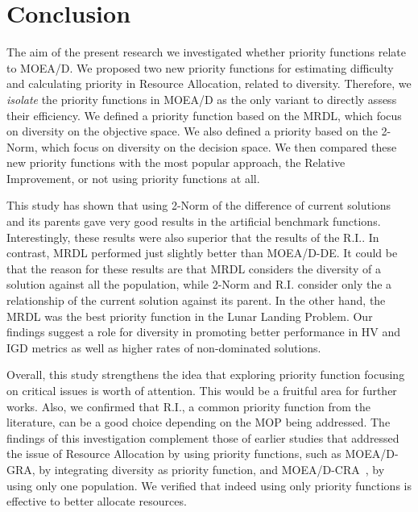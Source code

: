 \section{Conclusion}
The aim of the present research we investigated whether priority functions relate to MOEA/D.
We proposed two new priority functions for estimating difficulty and calculating priority in Resource Allocation, related to diversity. Therefore, we \emph{isolate} the priority functions in MOEA/D as the only variant to directly assess their efficiency. We defined a priority function based on the MRDL, which focus on diversity on the objective space. We also defined a priority based on the 2-Norm, which focus on diversity on the decision space. We then compared these new priority functions with the most popular approach, the Relative Improvement, or not using priority functions at all.

This study has shown that using 2-Norm of the difference of current solutions and its parents gave very good results in the artificial benchmark functions. Interestingly, these results were also superior that the results of the R.I.. In contrast, MRDL performed just slightly better than MOEA/D-DE. It could be that the reason for these results are that MRDL considers the diversity of a solution against all the population, while 2-Norm and R.I. consider only the a relationship of the current solution against its parent. In the other hand, the MRDL was the best priority function in the Lunar Landing Problem. Our findings suggest a role for diversity in promoting better performance in HV and IGD metrics as well as higher rates of non-dominated solutions.

Overall, this study strengthens the idea that exploring priority function focusing on critical issues is worth of attention. This would be a fruitful area for further works. Also, we confirmed that R.I., a common priority function from the literature, can be a good choice depending on the MOP being addressed. 
The findings of this investigation complement those of earlier studies that addressed the issue of Resource Allocation by using priority functions, such as MOEA/D-GRA\cite{zhou2016all}, by integrating diversity as priority function, and MOEA/D-CRA~\cite{kang2018collaborative}, by using only one population. We verified that indeed using only priority functions is effective to better allocate resources.

